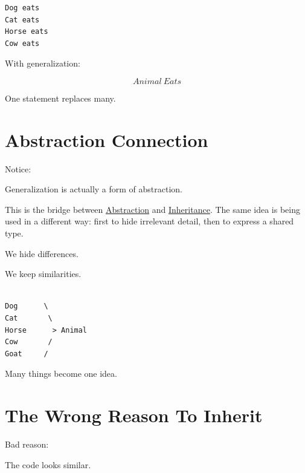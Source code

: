 \documentclass[11pt,a4paper]{book}
\begin{document}
\begin{verbatim}
Dog eats
Cat eats
Horse eats
Cow eats
\end{verbatim}


With generalization:

\[
Animal\ Eats
\]


One statement replaces many.


\section{Abstraction Connection}

Notice:

Generalization is actually a form of abstraction.

This is the bridge between \hyperref[chap:abstraction]{Abstraction} and \hyperref[chap:inheritance]{Inheritance}. The same idea is being used in a different way: first to hide irrelevant detail, then to express a shared type.


We hide differences.

We keep similarities.


\begin{verbatim}

Dog      \
Cat       \
Horse      > Animal
Cow       /
Goat     /

\end{verbatim}


Many things become one idea.


\section{The Wrong Reason To Inherit}

Bad reason:

\begin{center}
The code looks similar.
\end{center}
\end{document}
